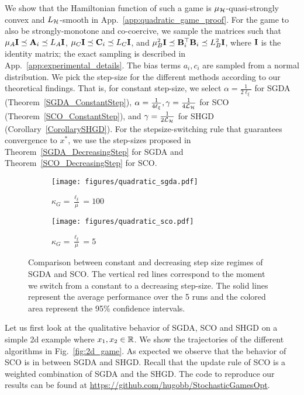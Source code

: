 \documentclass{article}
\begin{document}
We show that the Hamiltonian function of such a game is $\mu_{{\cal H}}$-quasi-strongly convex and $L_{{\cal H}}$-smooth in App.~\ref{app:quadratic_game_proof}. For the game to also be strongly-monotone and co-coercive, we sample the matrices such that $\mu_A \mathbf{I} \preceq\mathbf{A}_i \preceq L_A\mathbf{I}$, $\mu_C\mathbf{I} \preceq\mathbf{C}_i \preceq L_C\mathbf{I}$, and $\mu_B^2\mathbf{I} \preceq \mathbf{B}_i^\top\mathbf{B}_i \preceq L_B^2\mathbf{I}$, where $\mathbf{I}$ is the identity matrix; the exact sampling is described in App.~\ref{app:experimental_details}. The bias terms $a_i, c_i$ are sampled from a normal distribution. We pick the step-size for the different methods according to our theoretical findings. That is,  
for constant step-size, we select $\alpha=\frac{1}{2\ell_\xi}$ for SGDA (Theorem~\ref{SGDA_ConstantStep}), $\alpha=\frac{1}{4\ell_\xi}, \gamma=\frac{1}{4{\cal L}_{{\cal H}}}$ for SCO (Theorem~\ref{SCO_ConstantStep}), and $\gamma=\frac{1}{2{\cal L}_{{\cal H}}}$ for SHGD (Corollary~\ref{CorollarySHGD}). For the stepsize-switching rule that guarantees convergence to $x^*$, we use the step-sizes proposed in Theorem~\ref{SGDA_DecreasingStep} for SGDA and Theorem~\ref{SCO_DecreasingStep} for SCO.
\begin{figure}[t]
	\centering
	\begin{subfigure}[b]{0.25\textwidth}
		\texttt{[image: figures/quadratic\_sgda.pdf]}
		\caption{$\kappa_G=\frac{\ell_\xi}{\mu}=100$}
		\label{SGDAplot_switch}
	\end{subfigure}
		\begin{subfigure}[b]{0.25\textwidth}
		\texttt{[image: figures/quadratic\_sco.pdf]}
		\caption{$\kappa_G=\frac{\ell_\xi}{\mu}=5$}
		\label{SCOplot_switch}
	\end{subfigure}
	\vspace{-2mm}
	\caption{\small Comparison between constant and decreasing step size regimes of SGDA and SCO. The vertical red lines correspond to the moment we switch from a constant to a decreasing step-size. The solid lines represent the average performance over the 5 runs and the colored area represent the 95\% confidence intervals.}
	\label{fig:quadratic_game_decreasing}
\end{figure}
Let us first look at the qualitative behavior of SGDA, SCO and SHGD on a simple 2d example where $x_1,x_2 \in \mathbb{R}$. We show the trajectories of the different algorithms in Fig.~\ref{fig:2d_game}. As expected we observe that the behavior of SCO is in between SGDA and SHGD. Recall that the update rule of SCO is a weighted combination of SGDA and the SHGD. The code to reproduce our results can be found at \url{https://github.com/hugobb/StochasticGamesOpt}.
\end{document}
